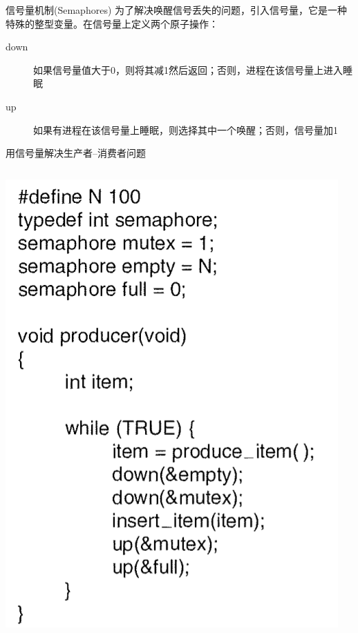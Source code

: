 \documentclass[xcolor=svgnames]{beamer}
\begin{document}
\begin{CJK*}{UTF8}{gbsn}
\begin{frame}{信号量机制(Semaphores)}
为了解决唤醒信号丢失的问题，引入信号量，它是一种特殊的整型变量。在信号量上定义两个\alert{原子操作}：
\begin{description}
\item[down]  如果信号量值大于0，则将其减1然后返回；否则，进程在该信号量上进入睡眠
\item[up]  如果有进程在该信号量上睡眠，则选择其中一个唤醒；否则，信号量加1 
\end{description}
\end{frame}

\begin{frame}{用信号量解决生产者--消费者问题}
\begin{columns}[b]
\includegraphics[width=1.0\textwidth]{prodsem.png}

\end{columns}
\end{frame}
\end{CJK*}
\end{document}
